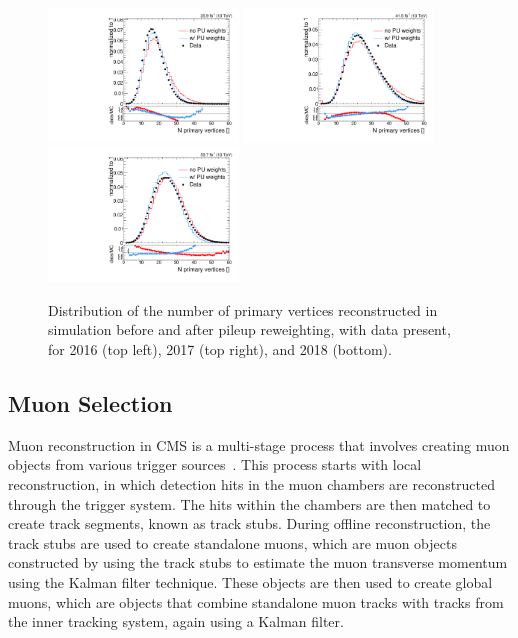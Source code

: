 \begin{figure}[htbp]
  \centering
  \includegraphics[width=0.45\textwidth]{fig/eventSelection/PUrewN_0_2016_nVert.pdf}
  \includegraphics[width=0.45\textwidth]{fig/eventSelection/PUrewN_0_2017_nVert.pdf}\\
  \includegraphics[width=0.45\textwidth]{fig/eventSelection/PUrewN_0_2018_nVert.pdf}
  \caption{
    Distribution of the number of primary vertices reconstructed in simulation before and after pileup reweighting, with data present, for 2016 (top left), 2017 (top right), and 2018 (bottom).
  }
  \label{fig:PUreweight}
\end{figure}

\subsection{Muon Selection}
\label{subsec:muonSelect}

Muon reconstruction in CMS is a multi-stage process that involves creating muon objects from various trigger sources~\cite{Sirunyan_2018_CMS}. %
This process starts with local reconstruction, in which detection hits in the muon chambers are reconstructed through the trigger system.
The hits within the chambers are then matched to create track segments, known as track stubs.
During offline reconstruction, the track stubs are used to create standalone muons, which are muon objects constructed by using the track stubs to estimate the muon transverse momentum using the Kalman filter technique.
These objects are then used to create global muons, which are objects that combine standalone muon tracks with tracks from the inner tracking system, again using a Kalman filter.

